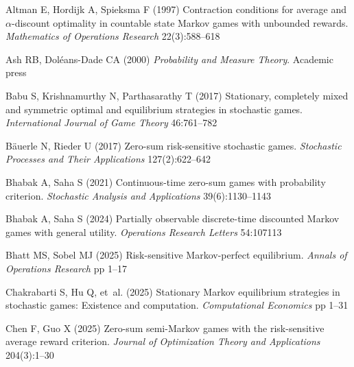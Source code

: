 \documentclass[12pt]{article}
\begin{document}
\begin{thebibliography}{}


Altman E, Hordijk A, Spieksma F (1997) {Contraction conditions for average and
	$\alpha$-discount optimality in countable state Markov games with unbounded
	rewards}. \textit{Mathematics of Operations Research} 22(3):588--618

Ash RB, Dol{\'e}ans-Dade CA (2000) \textit{Probability and Measure Theory}.
Academic press

Babu S, Krishnamurthy N, Parthasarathy T (2017) Stationary, completely mixed
and symmetric optimal and equilibrium strategies in stochastic games.
\textit{International Journal of Game Theory} 46:761--782

B{\"a}uerle N, Rieder U (2017) Zero-sum risk-sensitive stochastic games.
\textit{Stochastic Processes and Their Applications} 127(2):622--642

Bhabak A, Saha S (2021) Continuous-time zero-sum games with probability
criterion. \textit{Stochastic Analysis and Applications} 39(6):1130--1143

Bhabak A, Saha S (2024) {Partially observable discrete-time discounted Markov
	games with general utility}. \textit{Operations Research Letters} 54:107113

Bhatt MS, Sobel MJ (2025) {Risk-sensitive Markov-perfect equilibrium}.
\textit{Annals of Operations Research} pp 1--17


Chakrabarti S, Hu Q, et~al. (2025) {Stationary Markov equilibrium strategies in
	stochastic games: Existence and computation}. \textit{Computational
	Economics} pp 1--31

Chen F, Guo X (2025) {Zero-sum semi-Markov games with the risk-sensitive
	average reward criterion}. \textit{Journal of Optimization Theory and
	Applications} 204(3):1--30


\end{thebibliography}
\end{document}
